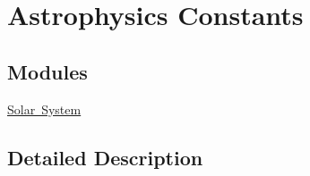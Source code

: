 \hypertarget{group___e_g_x_phys-_constants-_astrophysics}{}\section{Astrophysics Constants}
\label{group___e_g_x_phys-_constants-_astrophysics}
\subsection*{Modules}
\begin{DoxyCompactItemize}
\item 
\mbox{\hyperlink{group___e_g_x_phys-_constants-_astrophysics-_solar_system}{Solar System}}
\end{DoxyCompactItemize}


\subsection{Detailed Description}
